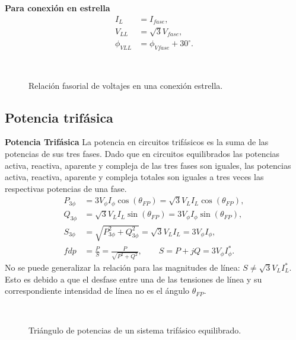 \documentclass[12pt,a4paper]{article}
\begin{document}
\textbf{Para conexión en estrella}
\begin{align*}
I_L&=I_{fase},\\
V_{LL}&=\sqrt{3}V_{fase},\\
\phi_{VLL}&=\phi_{Vfase}+30^\circ.
\end{align*}
\begin{figure}[H]\centering
{}
\caption{Relación fasorial de voltajes en una conexión estrella.}~\label{fig:p6-relaciones-estrella}
\end{figure}
\subsection{Potencia trifásica}
\textbf{Potencia Trifásica}
La potencia en circuitos trifásicos es la suma de las potencias de sus tres fases. Dado que en circuitos equilibrados las potencias activa, reactiva, aparente y compleja de las tres fases son iguales, las potencias activa, reactiva, aparente y compleja totales son iguales a tres veces las respectivas potencias de una fase.
\begin{align*}
P_{3\phi}&=3V_\phi I_\phi\cos(\theta_{FP})=\sqrt{3}V_L I_L\cos(\theta_{FP}),\\
Q_{3\phi}&=\sqrt{3}V_L I_L\sin(\theta_{FP})=3V_\phi I_\phi\sin(\theta_{FP}),\\
S_{3\phi}&=\sqrt{P_{3\phi}^{2}+Q_{3\phi}^{2}}=\sqrt{3}V_L I_L=3V_\phi I_\phi,\\
fdp&=\frac{P}{S}=\frac{P}{\sqrt{P^2+Q^2}},\qquad S=P+jQ=3V_\phi I_\phi^*.
\end{align*}
No se puede generalizar la relación para las magnitudes de línea: $S\ne\sqrt{3}V_L I_L^*$. Esto es debido a que el desfase entre una de las tensiones de línea y su correspondiente intensidad de línea no es el ángulo $\theta_{FP}$.
\begin{figure}[H]\centering
{}
\caption{Triángulo de potencias de un sistema trifásico equilibrado.}~\label{fig:p6-triangulo-potencias}
\end{figure}
\end{document}
